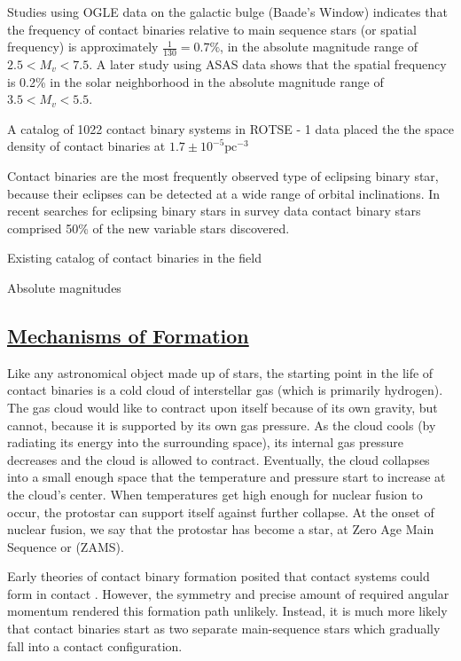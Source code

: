 \documentclass[12pt]{article} %
\numberwithin{equation}{section} %
\begin{document}
 \citep{rucinski1998contact} Studies using OGLE data on the galactic bulge (Baade's Window) indicates that the frequency of contact binaries relative to main sequence stars (or spatial frequency) is approximately $\frac{1}{130} = 0.7\%$, in the absolute magnitude range of $2.5 < M_{v} < 7.5$. A later study using ASAS data shows that the spatial frequency is 0.2\% in the solar neighborhood \citep{rucinski2006luminosity} in the absolute magnitude range of $3.5 < M_{v} < 5.5$.

A catalog of 1022 contact binary systems in ROTSE - 1 data placed the the space density of contact binaries at $1.7 \pm 10^{-5} \text{pc}^{-3}$ \citep{gettel2006catalog}
 
Contact binaries are the most frequently observed type of eclipsing binary star, because their eclipses can be detected at a wide range of orbital inclinations. In recent searches for eclipsing binary stars in survey data \citep{drake2014catalina} contact binary stars comprised 50\% of the new variable stars discovered. 

Existing catalog of contact binaries in the field \citep{pribulla2003catalogue}

Absolute magnitudes \citep{rucinski1997absolute} 

\subsection[Mechanisms of Formation]{\hyperlink{toc}{Mechanisms of Formation}}

Like any astronomical object made up of stars, the starting point in the life of contact binaries is a cold cloud of interstellar gas (which is primarily hydrogen). The gas cloud would like to contract upon itself because of its own gravity, but cannot, because it is supported by its own gas pressure. As the cloud cools (by radiating its energy into the surrounding space), its internal gas pressure decreases and the cloud is allowed to contract. Eventually, the cloud collapses into a small enough space that the temperature and pressure start to increase at the cloud's center. When temperatures get high enough for nuclear fusion to occur, the protostar can support itself against further collapse. At the onset of nuclear fusion, we say that the protostar has become a star, at Zero Age Main Sequence or (ZAMS).  

Early theories of contact binary formation posited that contact systems could form in contact \citet{lucy1968structure}. However, the symmetry and precise amount of required angular momentum rendered this formation path unlikely. Instead, it is much more likely that contact binaries start as two separate main-sequence stars which gradually fall into a contact configuration.
\end{document}
